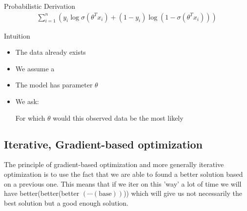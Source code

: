 \begin{parag}{Probabilistic Derivation}
	\begin{align*} 
		\sum_{i= 1}^{n}\left(y_i\log \sigma\left(\theta^{T}x_i\right) + \left(1 - y_i\right)\log \left(1 - \sigma\left(\theta^{T}x_i\right)\right)\right)
	\end{align*}
	\begin{subparag}{Intuition}
	    \begin{itemize}
			\item The data already exists
			\item We assume a 
			\item The model has parameter $\theta$
			\item We ask:
				\begin{center}
				    For which $\theta$ would this observed data be the most likely
				\end{center}
	    \end{itemize}
	    
	\end{subparag}
	
\end{parag}



\subsection{Iterative, Gradient-based optimization}
The principle of gradient-based optimization and more generally iterative optimization is to use the fact that we are able to found a better solution based on a previous one. This means that if we iter on this 'way' a lot of time we will have better(better(better $\left(\cdots(\text{base})\right)$)) which will give us not necessarily the best solution but a good enough solution.


